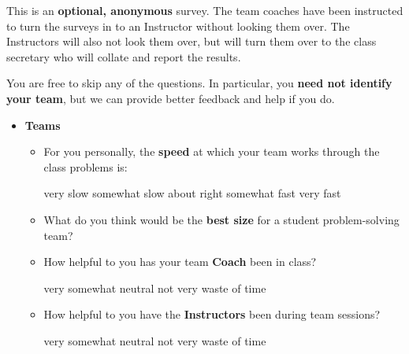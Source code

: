 \documentclass[handout]{mcs}
\begin{document}

This is an \textbf{optional, anonymous} survey.  The team coaches have been
instructed to turn the surveys in to an Instructor without looking
them over.  The Instructors will also not look them over, but will
turn them over to the class secretary who will collate and report the
results.

You are free to skip any of the questions.  In particular, you \textbf{need
not identify your team}, but we can provide better feedback and help if
you do.

\begin{center}
{\large   \qquad   \teaminfo}
\end{center}

\begin{itemize}

\item \textbf{Teams}
\begin{itemize}

\item For you personally, the \textbf{speed} at which your team works through
  the class problems is:

\begin{center}
very slow\hspace{0.3in} somewhat slow\hspace{0.3in} about
right\hspace{0.3in} somewhat fast\hspace{0.3in} very fast
\end{center}

\item What do you think would be the \textbf{best size} for a student
  problem-solving team? \brule{0.5in}

\item How helpful to you has your team \textbf{Coach} been in class?

\begin{center}
very\hspace{0.5in} somewhat \hspace{0.5in} neutral\hspace{0.5in} not
very \hspace{0.5in} waste of time
\end{center}

\item How helpful to you have the \textbf{Instructors} been during team sessions?

\begin{center}
very\hspace{0.5in} somewhat \hspace{0.5in} neutral\hspace{0.5in} not
very \hspace{0.5in} waste of time
\end{center}


\end{itemize}
\end{itemize}
\end{document}
